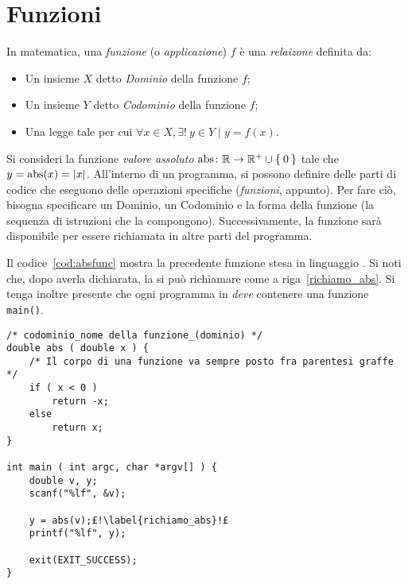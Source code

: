 	\section{Funzioni}
In matematica, una \emph{funzione} (o \emph{applicazione}) $f$ è una \emph{relaizone} definita da:
\begin{itemize}
	\item
Un insieme $X$ detto \emph{Dominio} della funzione $f$;
	\item
Un insieme $Y$ detto \emph{Codominio} della funzione $f$;
	\item
Una legge tale per cui $\forall x \in X, \exists! \ y \in Y \mid y=f(x)$.
\end{itemize}

Si consideri la funzione \emph{valore assoluto} $\mathop{\mathrm{abs}}\colon\mathbb{R}\to\mathbb{R}^+\cup\Set{0}$ tale che $y = \mathop{\mathrm{abs}}(x)=\lvert x\rvert$.
All'interno di un programma, si possono definire delle parti di codice che eseguono delle operazioni specifiche (\emph{funzioni}, appunto).
Per fare ciò, bisogna specificare un Dominio, un Codominio e la forma della funzione (la sequenza di istruzioni che la compongono).
Successivamente, la funzione sarà disponibile per essere richiamata in altre parti del programma.

Il codice~\ref{cod:absfunc} mostra la precedente funzione stesa in linguaggio .
Si noti che, dopo averla dichiarata, la si può richiamare come a riga~\ref{richiamo_abs}.
Si tenga inoltre presente che ogni programma in  \emph{deve} contenere una funzione \lstinline!main()!.
\begin{lstlisting}[caption={\em Definizione e chiamata della funzine \lstinline!abs()!.}, label={cod:absfunc}]
/* codominio_nome della funzione_(dominio) */
double abs ( double x ) {
	/* Il corpo di una funzione va sempre posto fra parentesi graffe */
	if ( x < 0 )
		return -x;
	else
		return x;
}

int main ( int argc, char *argv[] ) {
	double v, y;
	scanf("%lf", &v);

	y = abs(v);£!\label{richiamo_abs}!£
	printf("%lf", y);

	exit(EXIT_SUCCESS);
}
\end{lstlisting}

